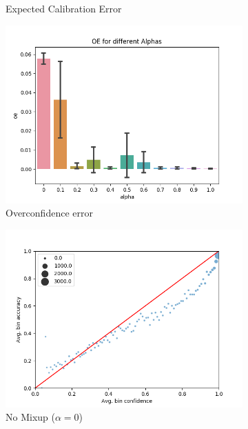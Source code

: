 \begin{figure}[h]
\begin{subfigure}[b]{0.31\textwidth}
         \caption{Expected Calibration Error}
     \end{subfigure}
     \begin{subfigure}[b]{0.31\textwidth}
         \centering
         \includegraphics[width=\textwidth]{images/cifar/oeValpha.png}
         \caption{Overconfidence error}
     \end{subfigure}
     \begin{subfigure}[b]{0.31\textwidth}
         \centering
         \noindent\includegraphics[width=\textwidth]{images/cifar/scatterplot_0.png}
         \caption{No Mixup ($\alpha=0$)}
     \end{subfigure}
     \begin{subfigure}[b]{0.31\textwidth}

\end{subfigure}
\end{figure}
